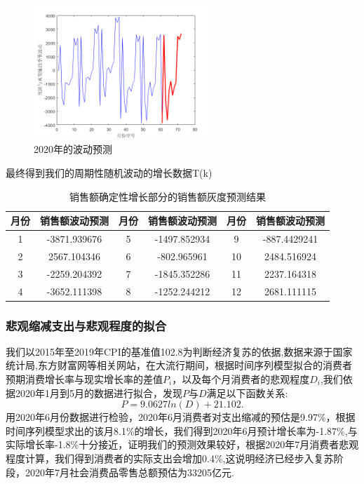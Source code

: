 \documentclass{whutmod}
\begin{document}
	\begin{figure}[!htbp]
		\centering
		\includegraphics[width=0.6\textwidth]{time.png}
		\caption{2020年的波动预测}
	\end{figure}
	
	最终得到我们的周期性随机波动的增长数据T(k)
	\begin{table}[!htbp]
		\caption{销售额确定性增长部分的销售额灰度预测结果} \centering
		\begin{tabular}{cccccc}
			\toprule[1.5pt]
			月份 & 销售额波动预测 & 月份 & 销售额波动预测 & 月份 & 销售额波动预测\\
			\midrule[1pt]
			1&-3871.939676&	5&-1497.852934&9&-887.4429241\\
			2&2567.104346&	6&-802.965961&10&2484.516924 \\
			3&-2259.204392&	7&-1845.352286&11&2237.164318\\
			4&-3652.111398&	8&-1252.244212&12&2681.111115\\
			\bottomrule[1.5pt]
		\end{tabular}
	\end{table}
	
	
	\subsubsection{悲观缩减支出与悲观程度的拟合}
	我们以2015年至2019年CPI的基准值102.8为判断经济复苏的依据,数据来源于国家统计局,东方财富网等相关网站，在大流行期间，根据时间序列模型拟合的消费者预期消费增长率与现实增长率的差值$P_{i}$，以及每个月消费者的悲观程度$D_{i}$,我们依据2020年1月到5月的数据进行拟合，发现$P$与$D$满足以下函数关系:
	\begin{equation}
	P=9.0627ln(D)+21.102.
	\end{equation}
	用2020年6月份数据进行检验，2020年6月消费者对支出缩减的预估是9.97\%，根据时间序列模型求出的该月8.1\%的增长，我们得到2020年6月预计增长率为-1.87\%,与实际增长率-1.8\%十分接近，证明我们的预测效果较好，根据2020年7月消费者悲观程度计算，我们得到消费者的实际支出会增加0.4\%,这说明经济已经步入复苏阶段，2020年7月社会消费品零售总额预估为33205亿元.
	
\end{document}
